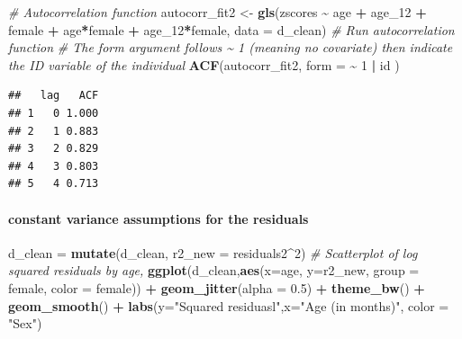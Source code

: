 \documentclass[
]{article}
\newenvironment{Shaded}{\begin{snugshade}}{\end{snugshade}}
\newcommand{\AttributeTok}[1]{\textcolor[rgb]{0.13,0.29,0.53}{#1}}
\newcommand{\CommentTok}[1]{\textcolor[rgb]{0.56,0.35,0.01}{\textit{#1}}}
\newcommand{\DecValTok}[1]{\textcolor[rgb]{0.00,0.00,0.81}{#1}}
\newcommand{\FloatTok}[1]{\textcolor[rgb]{0.00,0.00,0.81}{#1}}
\newcommand{\FunctionTok}[1]{\textcolor[rgb]{0.13,0.29,0.53}{\textbf{#1}}}
\newcommand{\NormalTok}[1]{#1}
\newcommand{\OtherTok}[1]{\textcolor[rgb]{0.56,0.35,0.01}{#1}}
\newcommand{\SpecialCharTok}[1]{\textcolor[rgb]{0.81,0.36,0.00}{\textbf{#1}}}
\newcommand{\StringTok}[1]{\textcolor[rgb]{0.31,0.60,0.02}{#1}}
\begin{document}
\begin{Shaded}
\begin{Highlighting}[]
\CommentTok{\# Autocorrelation function}
\NormalTok{autocorr\_fit2 }\OtherTok{\textless{}{-}} \FunctionTok{gls}\NormalTok{(zscores }\SpecialCharTok{\textasciitilde{}}\NormalTok{ age }\SpecialCharTok{+}\NormalTok{ age\_12 }\SpecialCharTok{+}\NormalTok{ female }\SpecialCharTok{+}\NormalTok{ age}\SpecialCharTok{*}\NormalTok{female }\SpecialCharTok{+}\NormalTok{ age\_12}\SpecialCharTok{*}\NormalTok{female, }\AttributeTok{data =}\NormalTok{ d\_clean)}
\CommentTok{\# Run autocorrelation function}
\CommentTok{\# The form argument follows \textasciitilde{} 1 (meaning no covariate) then indicate the ID variable of the individual}
\FunctionTok{ACF}\NormalTok{(autocorr\_fit2, }\AttributeTok{form =} \SpecialCharTok{\textasciitilde{}}   \DecValTok{1} \SpecialCharTok{|}\NormalTok{ id )}
\end{Highlighting}
\end{Shaded}

\begin{verbatim}
##   lag   ACF
## 1   0 1.000
## 2   1 0.883
## 3   2 0.829
## 4   3 0.803
## 5   4 0.713
\end{verbatim}

\hypertarget{constant-variance-assumptions-for-the-residuals-1}{%
\paragraph{constant variance assumptions for the
residuals}\label{constant-variance-assumptions-for-the-residuals-1}}

\begin{Shaded}
\begin{Highlighting}[]
\NormalTok{d\_clean }\OtherTok{=} \FunctionTok{mutate}\NormalTok{(d\_clean, }\AttributeTok{r2\_new =}\NormalTok{ residuals2}\SpecialCharTok{\^{}}\DecValTok{2}\NormalTok{)}
\CommentTok{\# Scatterplot of log squared residuals by age,}
\FunctionTok{ggplot}\NormalTok{(d\_clean,}\FunctionTok{aes}\NormalTok{(}\AttributeTok{x=}\NormalTok{age, }\AttributeTok{y=}\NormalTok{r2\_new, }\AttributeTok{group =}\NormalTok{ female, }\AttributeTok{color =}\NormalTok{ female)) }\SpecialCharTok{+}
    \FunctionTok{geom\_jitter}\NormalTok{(}\AttributeTok{alpha =} \FloatTok{0.5}\NormalTok{) }\SpecialCharTok{+}
    \FunctionTok{theme\_bw}\NormalTok{() }\SpecialCharTok{+}
    \FunctionTok{geom\_smooth}\NormalTok{() }\SpecialCharTok{+}
    \FunctionTok{labs}\NormalTok{(}\AttributeTok{y=}\StringTok{"Squared residuasl"}\NormalTok{,}\AttributeTok{x=}\StringTok{"Age (in months)"}\NormalTok{, }\AttributeTok{color =} \StringTok{"Sex"}\NormalTok{)}
\end{Highlighting}
\end{Shaded}
\end{document}
